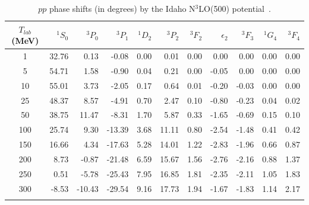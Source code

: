 \documentclass[sort&compress,preprint,3p]{elsarticle}
\begin{document}
\begin{table}
\caption{$pp$ phase shifts (in degrees) by the Idaho N$^3$LO(500) potential~\cite{EM03}.
\label{tab_pp}}
\smallskip
\begin{tabular*}{\textwidth}{@{\extracolsep{\fill}}crrrrrrrrrr}
\hline 
\hline 
\noalign{\smallskip}
 $T_{lab}$ (MeV)
 & $^1S_0$
 & $^3P_0$
 & $^3P_1$
 & $^1D_2$
 & $^3P_2$
 & $^3F_2$
 & $\epsilon_2$
 & $^3F_3$
 & $^1G_4$
 & $^3F_4$
\\
 \hline 
    1 &  32.76 &   0.13 &  -0.08 &   0.00 &   0.01 &   0.00 &   0.00 &   0.00 &   0.00 &   0.00 \\
    5 &  54.71 &   1.58 &  -0.90 &   0.04 &   0.21 &   0.00 &  -0.05 &   0.00 &   0.00 &   0.00 \\
   10 &  55.01 &   3.73 &  -2.05 &   0.17 &   0.64 &   0.01 &  -0.20 &  -0.03 &   0.00 &   0.00 \\
   25 &  48.37 &   8.57 &  -4.91 &   0.70 &   2.47 &   0.10 &  -0.80 &  -0.23 &   0.04 &   0.02 \\
   50 &  38.75 &  11.47 &  -8.31 &   1.70 &   5.87 &   0.33 &  -1.65 &  -0.69 &   0.15 &   0.10 \\
  100 &  25.74 &   9.30 & -13.39 &   3.68 &  11.11 &   0.80 &  -2.54 &  -1.48 &   0.41 &   0.42 \\
  150 &  16.66 &   4.34 & -17.63 &   5.28 &  14.01 &   1.22 &  -2.83 &  -1.96 &   0.66 &   0.87 \\
  200 &   8.73 &  -0.87 & -21.48 &   6.59 &  15.67 &   1.56 &  -2.76 &  -2.16 &   0.88 &   1.37 \\
  250 &   0.51 &  -5.78 & -25.43 &   7.95 &  16.85 &   1.81 &  -2.35 &  -2.11 &   1.05 &   1.83 \\
  300 &  -8.53 & -10.43 & -29.54 &   9.16 &  17.73 &   1.94 &  -1.67 &  -1.83 &   1.14 &   2.17 \\
\hline
\hline
\noalign{\smallskip}
\end{tabular*}
\end{table}
\end{document}

